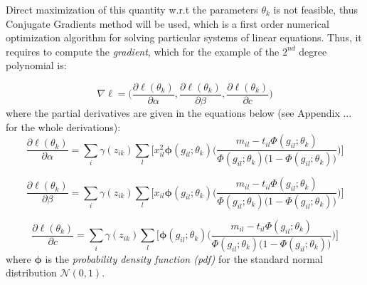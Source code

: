 Direct maximization of this quantity w.r.t the parameters $\theta_{k}$ is not feasible, thus Conjugate Gradients method \citep{Hestenes1952} will be used, which is a first order numerical optimization algorithm for solving particular systems of linear equations. Thus, it requires to compute the \emph{gradient}, which for the example of the $2^{nd}$ degree polynomial is:

\begin{equation} \label{gradient-f}
	\nabla\ell = \bigg( \frac{\partial \ell(\theta_{k})}{\partial \alpha}, \frac{\partial \ell(\theta_{k})}{\partial \beta}, \frac{\partial \ell(\theta_{k})}{\partial c}\bigg) 
\end{equation}
where the partial derivatives are given in the equations below (see Appendix ... for the whole derivations):
\begin{equation} \label{derivative-a-f}
	\frac{\partial \ell(\theta_{k})}{\partial \alpha} =  \sum_{i}  \gamma(z_{ik}) \sum_{l} \bigg[ x_{il}^{2} \mathbf{\phi}(g_{il};\theta_{k})\bigg(\frac{m_{il} - t_{il}\Phi(g_{il};\theta_{k})}{\Phi(g_{il};\theta_{k})\big(1-\Phi(g_{il};\theta_{k})\big)} \bigg) \bigg]
\end{equation}

\begin{equation} \label{derivative-b-f}
	\frac{\partial \ell(\theta_{k})}{\partial \beta} =  \sum_{i}  \gamma(z_{ik}) \sum_{l} \bigg[ x_{il} \mathbf{\phi}(g_{il};\theta_{k})\bigg(\frac{m_{il} - t_{il}\Phi(g_{il};\theta_{k})}{\Phi(g_{il};\theta_{k})\big(1-\Phi(g_{il};\theta_{k})\big)} \bigg) \bigg]
\end{equation}

\begin{equation} \label{derivative-c-f}
	\frac{\partial \ell(\theta_{k})}{\partial c} =  \sum_{i}  \gamma(z_{ik}) \sum_{l} \bigg[ \mathbf{\phi}(g_{il};\theta_{k})\bigg(\frac{m_{il} - t_{il}\Phi(g_{il};\theta_{k})}{\Phi(g_{il};\theta_{k})\big(1-\Phi(g_{il};\theta_{k})\big)} \bigg) \bigg]
\end{equation}
where $\mathbf{\phi}$ is the \emph{probability density function (pdf)} for the standard normal distribution $\mathcal{N}(0,1)$.